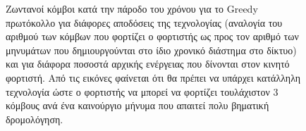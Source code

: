 \begin{figure}[H]
  \centering
  \caption{Ζωντανοί κόμβοι κατά την πάροδο του χρόνου για το Greedy πρωτόκολλο για διάφορες αποδόσεις της τεχνολογίας (αναλογία του αριθμού των κόμβων που φορτίζει
ο φορτιστής ως προς τον αριθμό των μηνυμάτων που δημιουργούνται στο ίδιο χρονικό διάστημα στο δίκτυο) και για διάφορα ποσοστά αρχικής ενέργειας που δίνονται στον
κινητό φορτιστή. Από τις εικόνες φαίνεται ότι θα πρέπει να υπάρχει κατάλληλη τεχνολογία ώστε ο φορτιστής να μπορεί να φορτίζει τουλάχιστον 3 κόμβους ανά ένα
καινούργιο μήνυμα που απαιτεί πολυ βηματική δρομολόγηση.}
  \label{fig:5exp_1_1}
\end{figure}


